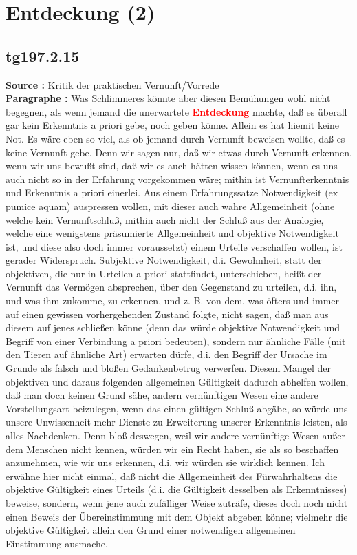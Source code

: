 \documentclass[a4paper,12pt,twoside]{book}
\newcommand{\match}[1]{\textcolor{red}{\textbf{#1}}}
\newcommand{\unnumberedsection}[1]{
	\section*{#1}
	\addcontentsline{toc}{section}{#1}
	\markright{#1}
}
\begin{document}
	\unnumberedsection{Entdeckung (2)} 
	\subsection*{tg197.2.15} 
	\textbf{Source : }Kritik der praktischen Vernunft/Vorrede\\  
	
	\textbf{Paragraphe : }Was Schlimmeres könnte aber diesen Bemühungen wohl nicht begegnen, als wenn jemand die unerwartete \match{Entdeckung} machte, daß es überall gar kein Erkenntnis a priori gebe, noch geben könne. Allein es hat hiemit keine Not. Es wäre eben so viel, als ob jemand durch Vernunft beweisen wollte, daß es keine Vernunft gebe. Denn wir sagen nur, daß wir etwas durch Vernunft erkennen, wenn wir uns bewußt sind, daß wir es auch hätten wissen können, wenn es uns auch nicht so in der Erfahrung vorgekommen wäre; mithin ist Vernunfterkenntnis und Erkenntnis a priori einerlei. Aus einem Erfahrungssatze Notwendigkeit (ex pumice aquam) auspressen wollen, mit dieser auch wahre Allgemeinheit (ohne welche kein Vernunftschluß, mithin auch nicht der Schluß aus der Analogie, welche eine wenigstens präsumierte Allgemeinheit und objektive Notwendigkeit ist, und diese also doch immer voraussetzt) einem Urteile verschaffen wollen, ist gerader Widerspruch. Subjektive Notwendigkeit, d.i. Gewohnheit, statt der objektiven, die nur in Urteilen a priori stattfindet, unterschieben, heißt der Vernunft das Vermögen absprechen, über den Gegenstand zu urteilen, d.i. ihn, und was ihm zukomme, zu erkennen, und z. B. von dem, was öfters und immer auf einen gewissen vorhergehenden Zustand folgte, nicht sagen, daß man aus diesem auf jenes schließen könne (denn das würde objektive Notwendigkeit und Begriff von einer Verbindung a priori bedeuten), sondern nur ähnliche Fälle (mit den Tieren auf ähnliche Art) erwarten dürfe, d.i. den Begriff der Ursache im Grunde als  falsch und bloßen Gedankenbetrug verwerfen. Diesem Mangel der objektiven und daraus folgenden allgemeinen Gültigkeit dadurch abhelfen wollen, daß man doch keinen Grund sähe, andern vernünftigen Wesen eine andere Vorstellungsart beizulegen, wenn das einen gültigen Schluß abgäbe, so würde uns unsere Unwissenheit mehr Dienste zu Erweiterung unserer Erkenntnis leisten, als alles Nachdenken. Denn bloß deswegen, weil wir andere vernünftige Wesen außer dem Menschen nicht kennen, würden wir ein Recht haben, sie als so beschaffen anzunehmen, wie wir uns erkennen, d.i. wir würden sie wirklich kennen. Ich erwähne hier nicht einmal, daß nicht die Allgemeinheit des Fürwahrhaltens die objektive Gültigkeit eines Urteils (d.i. die Gültigkeit desselben als Erkenntnisses) beweise, sondern, wenn jene auch zufälliger Weise zuträfe, dieses doch noch nicht einen Beweis der Übereinstimmung mit dem Objekt abgeben könne; vielmehr die objektive Gültigkeit allein den Grund einer notwendigen allgemeinen Einstimmung ausmache. 
	
\end{document}
